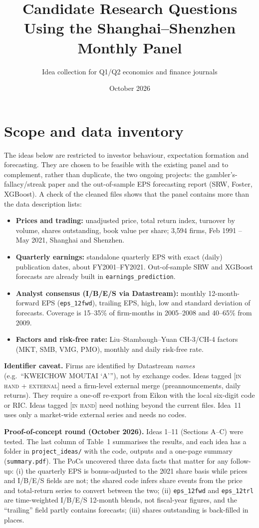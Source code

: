 \documentclass[10pt]{article}
\title{Candidate Research Questions Using the Shanghai--Shenzhen Monthly Panel}
\author{Idea collection for Q1/Q2 economics and finance journals}
\date{October 2026}
\newcommand{\inhand}{\textsc{[in hand]}}
\newcommand{\ext}{\textsc{[in hand + external]}}
\begin{document}
\maketitle

\section*{Scope and data inventory}

The ideas below are restricted to investor behaviour, expectation formation and forecasting. They are chosen to be
feasible with the existing panel and to complement, rather than duplicate, the two ongoing projects: the
gambler's-fallacy/streak paper and the out-of-sample EPS forecasting report (SRW, Foster, XGBoost). A check of the
cleaned files shows that the panel contains more than the data description lists:

\begin{itemize}
\item \textbf{Prices and trading:} unadjusted price, total return index, turnover by volume, shares outstanding,
  book value per share; 3{,}594 firms, Feb 1991 -- May 2021, Shanghai and Shenzhen.
\item \textbf{Quarterly earnings:} standalone quarterly EPS with exact (daily) publication dates, about FY2001--FY2021.
  Out-of-sample SRW and XGBoost forecasts are already built in \texttt{earnings\_prediction}.
\item \textbf{Analyst consensus (I/B/E/S via Datastream):} monthly 12-month-forward EPS (\texttt{eps\_12fwd}),
  trailing EPS, high, low and standard deviation of forecasts. Coverage is 15--35\% of firm-months in 2005--2008 and
  40--65\% from 2009.
\item \textbf{Factors and risk-free rate:} Liu--Stambaugh--Yuan CH-3/CH-4 factors (MKT, SMB, VMG, PMO), monthly and
  daily risk-free rate.
\end{itemize}

\textbf{Identifier caveat.} Firms are identified by Datastream \emph{names} (e.g.\ ``KWEICHOW MOUTAI `A'''), not by
exchange codes. Ideas tagged \ext{} need a firm-level external merge (preannouncements, daily returns). They require a
one-off re-export from Eikon with the local six-digit code or RIC. Ideas tagged \inhand{} need nothing beyond the
current files. Idea~11 uses only a market-wide external series and needs no codes.

\textbf{Proof-of-concept round (October 2026).} Ideas 1--11 (Sections A--C) were tested. The last column of
Table~1 summarises the results, and each idea has a folder in \texttt{project\_ideas/} with the code, outputs and a
one-page summary (\texttt{summary.pdf}). The PoCs uncovered three data facts that matter for any follow-up:
(i) the quarterly EPS is bonus-adjusted to the 2021 share basis while prices and I/B/E/S fields are not; the
shared code infers share events from the price and total-return series to convert between the two; (ii)
\texttt{eps\_12fwd} and \texttt{eps\_12trl} are time-weighted I/B/E/S 12-month blends, not fiscal-year figures, and
the ``trailing'' field partly contains forecasts; (iii) shares outstanding is back-filled in places.
\end{document}
